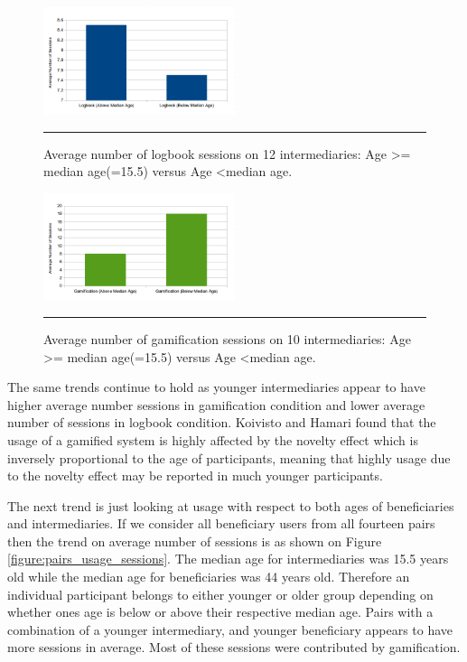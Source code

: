 \begin{figure}[htbp]
  \centering
    \includegraphics[width=0.5\textwidth]{Figures/logbookbyage_mod.png}
    \rule{35em}{0.5pt}
  \caption{Average number of logbook sessions on  12 intermediaries: Age \textgreater= median age(=15.5) versus Age \textless median age.}
  \label{figure:logbookbyage_mod}
\end{figure}
\begin{figure}[htbp]
  \centering
    \includegraphics[width=0.5\textwidth]{Figures/gambyage_mod.png}
    \rule{35em}{0.5pt}
  \caption{Average number of gamification sessions on  10 intermediaries: Age \textgreater= median age(=15.5) versus Age \textless median age.}
  \label{figure:gambyage_mod}
\end{figure}
The same trends continue to hold as younger intermediaries appear to have higher average number sessions in gamification condition and lower average number of sessions in logbook condition. Koivisto and Hamari \cite{koivisto2014demographic} found that the usage of  a gamified system is highly affected by the novelty effect which is inversely proportional to the age of participants, meaning that highly usage due to the novelty effect may be reported in much younger participants.

The next trend is just looking at usage with respect to both ages of beneficiaries and intermediaries.  If we consider all beneficiary users from all fourteen pairs then the trend on average number of sessions is as shown on Figure \ref{figure:pairs_usage_sessions}. The median age for intermediaries was 15.5 years old while the median age for beneficiaries was 44 years old. Therefore an individual participant belongs to either younger or older group depending on whether ones age is below or above their respective median age. Pairs with a combination of a younger intermediary, and younger beneficiary appears to have more sessions in average. Most of these sessions were contributed by gamification.
 
